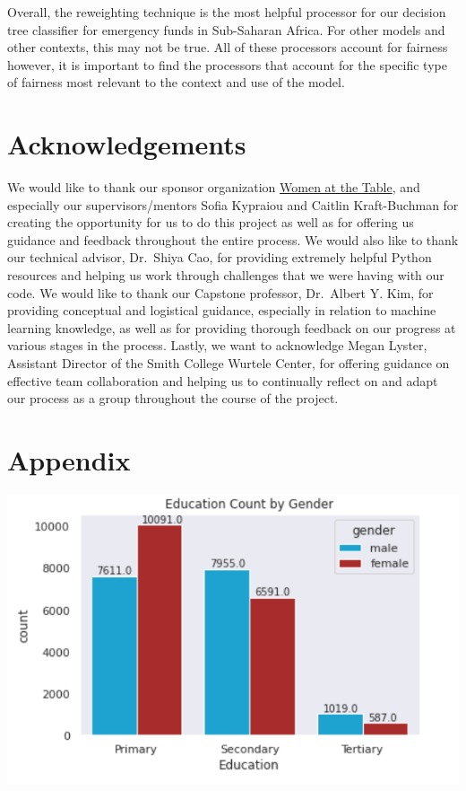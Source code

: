 \documentclass[water,article,submit,moreauthors,pdftex]{mdpi}
\begin{document}
Overall, the reweighting technique is the most helpful processor for our
decision tree classifier for emergency funds in Sub-Saharan Africa. For
other models and other contexts, this may not be true. All of these
processors account for fairness however, it is important to find the
processors that account for the specific type of fairness most relevant
to the context and use of the model.

\hypertarget{acknowledgements}{%
\section{Acknowledgements}\label{acknowledgements}}

We would like to thank our sponsor organization
\href{https://www.womenatthetable.net/}{Women at the Table}, and
especially our supervisors/mentors Sofia Kypraiou and Caitlin
Kraft-Buchman for creating the opportunity for us to do this project as
well as for offering us guidance and feedback throughout the entire
process. We would also like to thank our technical advisor, Dr.~Shiya
Cao, for providing extremely helpful Python resources and helping us
work through challenges that we were having with our code. We would like
to thank our Capstone professor, Dr.~Albert Y. Kim, for providing
conceptual and logistical guidance, especially in relation to machine
learning knowledge, as well as for providing thorough feedback on our
progress at various stages in the process. Lastly, we want to
acknowledge Megan Lyster, Assistant Director of the Smith College
Wurtele Center, for offering guidance on effective team collaboration
and helping us to continually reflect on and adapt our process as a
group throughout the course of the project.

\hypertarget{appendix}{%
\section{Appendix}\label{appendix}}

\includegraphics[width=\textwidth,height=0.5\textheight]{images/educ_count_gender.png}
\end{document}
